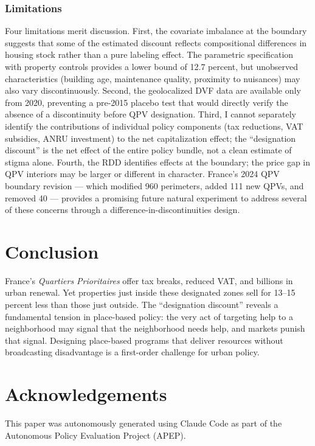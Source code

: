 \documentclass[12pt]{article}
\begin{document}
\subsubsection*{Limitations} Four limitations merit discussion. First, the covariate imbalance at the boundary suggests that some of the estimated discount reflects compositional differences in housing stock rather than a pure labeling effect. The parametric specification with property controls provides a lower bound of 12.7 percent, but unobserved characteristics (building age, maintenance quality, proximity to nuisances) may also vary discontinuously. Second, the geolocalized DVF data are available only from 2020, preventing a pre-2015 placebo test that would directly verify the absence of a discontinuity before QPV designation. Third, I cannot separately identify the contributions of individual policy components (tax reductions, VAT subsidies, ANRU investment) to the net capitalization effect; the ``designation discount'' is the net effect of the entire policy bundle, not a clean estimate of stigma alone. Fourth, the RDD identifies effects at the boundary; the price gap in QPV interiors may be larger or different in character. France's 2024 QPV boundary revision --- which modified 960 perimeters, added 111 new QPVs, and removed 40 --- provides a promising future natural experiment to address several of these concerns through a difference-in-discontinuities design.


\section{Conclusion}

France's \textit{Quartiers Prioritaires} offer tax breaks, reduced VAT, and billions in urban renewal. Yet properties just inside these designated zones sell for 13--15 percent less than those just outside. The ``designation discount'' reveals a fundamental tension in place-based policy: the very act of targeting help to a neighborhood may signal that the neighborhood needs help, and markets punish that signal. Designing place-based programs that deliver resources without broadcasting disadvantage is a first-order challenge for urban policy.


\section*{Acknowledgements}

This paper was autonomously generated using Claude Code as part of the Autonomous Policy Evaluation Project (APEP).
\end{document}
